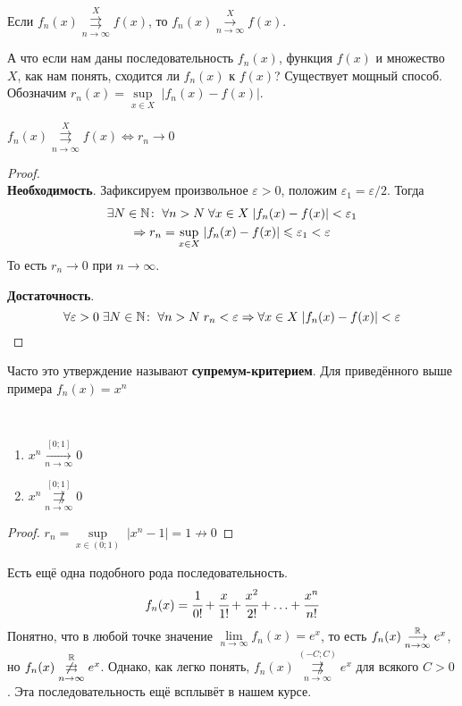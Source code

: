 \documentclass[a4paper, 12pt]{article}
\begin{document}
	\begin{Statement}
		Если $f_n(x)\overset{X}{\underset{n\to\infty}{\rightrightarrows}} f(x)$, то $f_n(x) \overset{X}{\underset{n\to\infty}{\longrightarrow}} f(x)$.
	\end{Statement}
	\par А что если нам даны последовательность $f_n(x)$, функция $f(x)$ и множество $X$, как нам понять, сходится ли $f_n(x)$ к $f(x)$? Существует мощный способ. Обозначим $r_n(x) =\underset{x \in X}{\sup}\;|f_n(x) - f(x)|$.
	\begin{Statement}
		$f_n(x)\overset{X}{\underset{n\to\infty}{\rightrightarrows}} f(x) \Leftrightarrow r_n\to 0$
	\end{Statement}
	\begin{proof}\ \\
		\textbf{Необходимость}. Зафиксируем произвольное $\varepsilon > 0$, положим $\varepsilon_1 = \varepsilon/2$. Тогда
		\begin{gather*}
			\exists N\in \mathbb{N} \colon\; \forall n>N\; \forall x \in X\; |f_n(x) - f(x)| < \varepsilon_1\\
			\Rightarrow r_n =  \underset{x \in X}{\sup}\; |f_n(x) - f(x)| \leqslant \varepsilon_1 < \varepsilon
		\end{gather*}
		То есть $r_n \to 0$ при $n\to \infty$.
		\par \textbf{Достаточность}.
		$$
		\forall \varepsilon > 0\; \exists N \in \mathbb{N}\colon \; \forall n>N\; r_n < \varepsilon \Rightarrow \forall x \in X\; |f_n(x) - f(x)| < \varepsilon
		$$
	\end{proof}
	Часто это утверждение называют \textbf{супремум-критерием}. Для приведённого выше примера $f_n(x) = x^n$
	\begin{Statement}\ \\		
		\begin{enumerate}
			\item $x^n \overset{[0;1]}{\underset{n\to\infty}{\longrightarrow}} 0$
			\item $x^n \overset{[0;1]}{\underset{n\to\infty}{\not\rightrightarrows}} 0$
		\end{enumerate}
	\end{Statement}
	\begin{proof}
		$r_n = \underset{x\in(0;1)}{\sup}\;|x^n - 1| = 1 \not\to 0$ 
	\end{proof}
	Есть ещё одна подобного рода последовательность.
	$$
		f_n(x) = \cfrac{1}{0!} + \cfrac{x}{1!} + \cfrac{x^2}{2!} + \ldots + \cfrac{x^n}{n!}
	$$
	Понятно, что в любой точке значение $\lim\limits_{n \to \infty} f_n(x) = e^x$, то есть 	$f_n(x) \overset{\mathbb{R}}{\underset{n\to\infty}{\longrightarrow}} e^x$, но $f_n(x) \overset{\mathbb{R}}{\underset{n\to\infty}{\not\rightrightarrows}} e^x$. Однако, как легко понять, $f_n(x) \overset{(-C;C)}{\underset{n\to\infty}{\not\rightrightarrows}} e^x$ для всякого $C>0$. Эта последовательность ещё всплывёт в нашем курсе.
\end{document}
